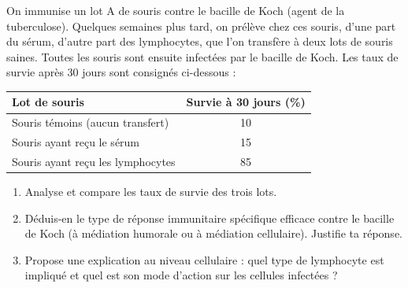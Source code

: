 \documentclass[11pt]{article}
\newcounter{popsec}
\newcounter{popsub}
\newcommand{\courssub}[1]{%
  \stepcounter{popsub}%
  \par\vspace{9pt}\noindent{\popxbold\fontsize{11.5}{13}\selectfont\color{popink}{\color{poporange}\thepopsec.\thepopsub}\hspace{6pt}#1}\par\nopagebreak\vspace{4pt}
}
\begin{document}
\courssub{Je m'entraîne}

\begin{exercice}
On immunise un lot A de souris contre le bacille de Koch (agent de la tuberculose). Quelques semaines plus tard, on prélève chez ces souris, d'une part du sérum, d'autre part des lymphocytes, que l'on transfère à deux lots de souris saines. Toutes les souris sont ensuite infectées par le bacille de Koch. Les taux de survie après 30 jours sont consignés ci-dessous :
\begin{center}
\begin{tabular}{|l|c|}
\hline
\rowcolor{popblueL} Lot de souris & Survie à 30 jours (\%) \\
\hline
Souris témoins (aucun transfert) & 10 \\
\hline
Souris ayant reçu le sérum & 15 \\
\hline
Souris ayant reçu les lymphocytes & 85 \\
\hline
\end{tabular}
\end{center}
\begin{enumerate}
\item Analyse et compare les taux de survie des trois lots.
\item Déduis-en le type de réponse immunitaire spécifique efficace contre le bacille de Koch (à médiation humorale ou à médiation cellulaire). Justifie ta réponse.
\item Propose une explication au niveau cellulaire : quel type de lymphocyte est impliqué et quel est son mode d'action sur les cellules infectées ?
\end{enumerate}
\end{exercice}
\end{document}
